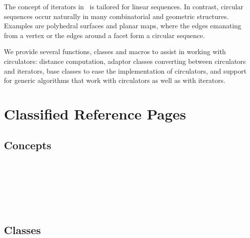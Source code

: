






The concept of iterators in \stl\ is tailored for linear sequences.
In contrast, circular sequences occur naturally in many combinatorial
and geometric structures. Examples are polyhedral surfaces and planar
maps, where the edges emanating from a vertex or the edges around a
facet form a circular sequence. 

We provide several functions, classes and macros to assist in working
with circulators: distance computation, adaptor classes converting
between circulators and iterators, base classes to ease the implementation
of circulators, and support for generic algorithms that work with
circulators as well as with iterators.

\section{Classified Reference Pages}

\subsection*{Concepts}

\\
\\
\\
\\
\\

\subsection*{Classes}

\\
\\
\\


